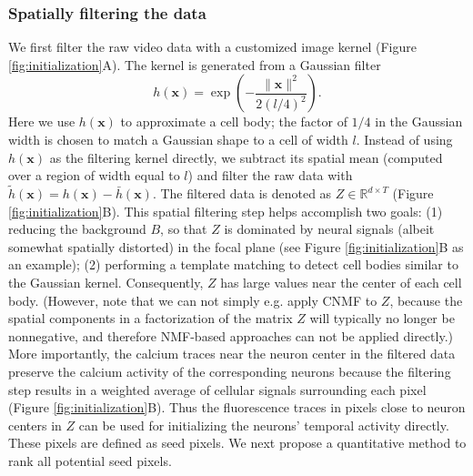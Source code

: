 \documentclass[9pt,lineno]{elife}
\begin{document}
\subsubsection{Spatially filtering the data}
We first filter the raw video data with a customized image kernel (Figure \ref{fig:initialization}A). The kernel is generated from a Gaussian filter 
\begin{equation}
  h(\bm{x}) = \exp \left( -\frac{\|\bm{x}\|^2}{2(l/4)^2} \right). \label{eq:gauss_kernel}
\end{equation}
Here we use $h(\bm{x})$ to approximate a cell body; the factor of $1/4$ in the Gaussian width is chosen to match a Gaussian shape to a cell of width $l$. Instead of using $h(\bm{x})$ as the filtering kernel directly, we subtract its spatial mean (computed over a region of width equal to  $l$)  and filter the raw data with $\tilde{h}(\bm{x}) = {h}(\bm{x})-\bar{h}(\bm{x}) $. The filtered data is denoted as $Z\in \mathbb{R}^{d\times T}$ (Figure \ref{fig:initialization}B). This spatial filtering step helps accomplish two goals: (1) reducing the background $B$, so that $Z$ is dominated by neural signals (albeit somewhat spatially distorted) in the focal plane (see Figure \ref{fig:initialization}B as an example); (2) performing a template matching to detect cell bodies similar to the Gaussian kernel. Consequently, $Z$ has large values near the center of each cell body.  (However, note that we can not simply e.g. apply CNMF to $Z$, because the spatial components in a factorization of the matrix $Z$ will typically no longer be nonnegative, and therefore NMF-based approaches can not be applied directly.)  More importantly, the calcium traces near the neuron center in the filtered data  preserve the calcium activity of the corresponding neurons because the filtering step results in a weighted average of cellular signals surrounding each pixel (Figure \ref{fig:initialization}B). Thus the fluorescence traces in pixels close to neuron centers in $Z$ can be used for initializing the neurons' temporal activity directly. These pixels are defined as seed pixels. We next propose a quantitative method to rank all potential seed pixels. 
\end{document}
